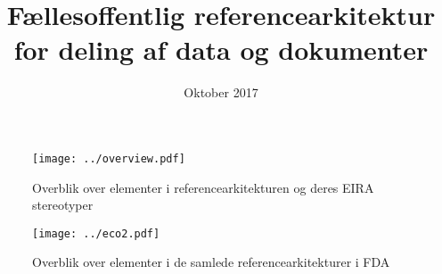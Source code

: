 \documentclass[10pt]{article}
\title{\rmfamily\Huge Fællesoffentlig referencearkitektur \\ for deling af data og dokumenter}
\author{}
\date{\rmfamily Oktober 2017}
\numberwithin{figure}{section}
\begin{document}
\maketitle \clearpage

\tableofcontents
\newpage




\newpage
\thispagestyle{empty}
\begin{figure}
\texttt{[image: ../overview.pdf]}
\caption{Overblik over elementer i referencearkitekturen og deres EIRA stereotyper}
\end{figure}

\newpage
\thispagestyle{empty}
\begin{figure}
\caption{Overblik over elementer i de samlede referencearkitekturer i FDA}
\texttt{[image: ../eco2.pdf]}

\end{figure}
\end{document}
